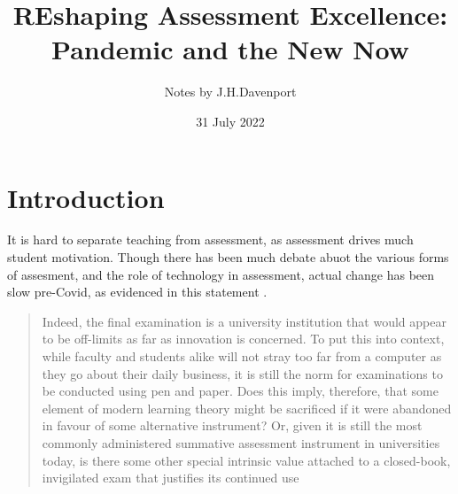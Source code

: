 \documentclass{article}
\begin{document}
\author{Notes by J.H.Davenport}
\title{REshaping Assessment Excellence: Pandemic and the New Now}
\date{31 July 2022}
\maketitle
\section{Introduction}
It is hard to separate teaching from assessment, as assessment drives much student motivation. Though there has been much debate abuot the various forms of assesment, and the role of technology in assessment, actual change has been slow pre-Covid, as evidenced in this statement \citep{WilliamsWong2009a}.
\begin{quote}
Indeed, the final examination is a university institution that would appear to be off-limits as far as innovation is concerned. To put this into context, while faculty and students alike will not stray too far from a computer as they go about their daily business, it is still the norm for examinations to be conducted using pen and paper. Does this imply, therefore, that some element of modern learning theory might be sacrificed if it were abandoned in favour of some alternative instrument? Or, given it is still the most commonly administered summative assessment instrument in universities today, is there some other special intrinsic value attached to a closed-book, invigilated exam that justifies its continued use
\end{quote}

\def\r{$\rightarrow$}
\end{document}
